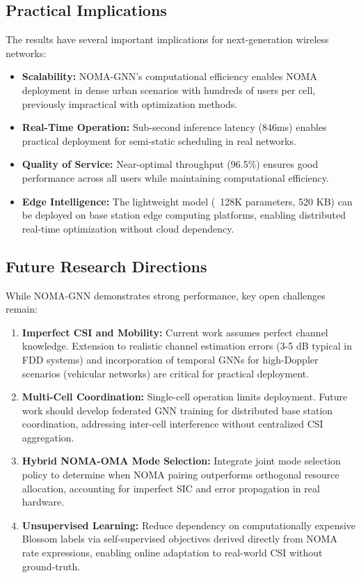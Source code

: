 \subsection{Practical Implications}

The results have several important implications for next-generation wireless networks:

\begin{itemize}
    \item \textbf{Scalability:} NOMA-GNN's computational efficiency enables NOMA deployment in dense urban scenarios with hundreds of users per cell, previously impractical with optimization methods.
    
    \item \textbf{Real-Time Operation:} Sub-second inference latency (846ms) enables practical deployment for semi-static scheduling in real networks.
    
    \item \textbf{Quality of Service:} Near-optimal throughput (96.5\%) ensures good performance across all users while maintaining computational efficiency.
    
    \item \textbf{Edge Intelligence:} The lightweight model (~128K parameters, 520 KB) can be deployed on base station edge computing platforms, enabling distributed real-time optimization without cloud dependency.
\end{itemize}

\subsection{Future Research Directions}

While NOMA-GNN demonstrates strong performance, key open challenges remain:

\begin{enumerate}
    \item \textbf{Imperfect CSI and Mobility:} Current work assumes perfect channel knowledge. Extension to realistic channel estimation errors (3-5 dB typical in FDD systems) and incorporation of temporal GNNs for high-Doppler scenarios (vehicular networks) are critical for practical deployment.
    
    \item \textbf{Multi-Cell Coordination:} Single-cell operation limits deployment. Future work should develop federated GNN training for distributed base station coordination, addressing inter-cell interference without centralized CSI aggregation.
    
    \item \textbf{Hybrid NOMA-OMA Mode Selection:} Integrate joint mode selection policy to determine when NOMA pairing outperforms orthogonal resource allocation, accounting for imperfect SIC and error propagation in real hardware.
    
    \item \textbf{Unsupervised Learning:} Reduce dependency on computationally expensive Blossom labels via self-supervised objectives derived directly from NOMA rate expressions, enabling online adaptation to real-world CSI without ground-truth.
\end{enumerate}

